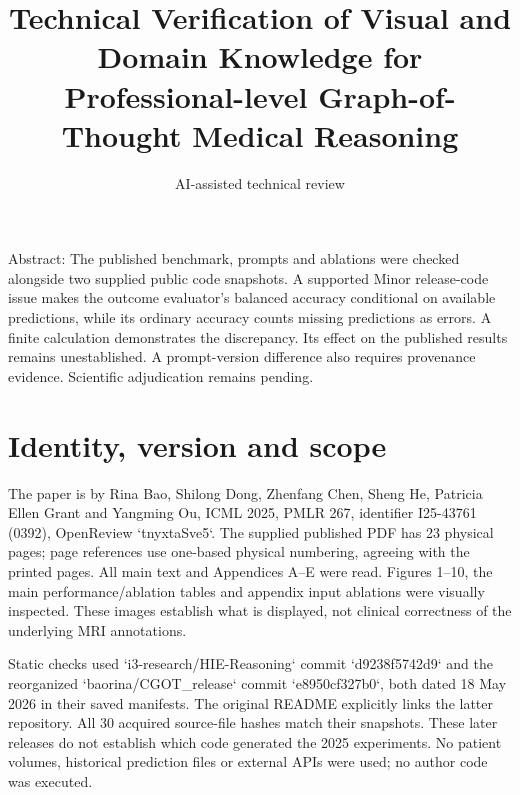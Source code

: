 \documentclass[10pt]{article}
\title{Technical Verification of Visual and Domain Knowledge for Professional-level Graph-of-Thought Medical Reasoning}
\author{AI-assisted technical review}
\date{}
\begin{document}
\maketitle
Abstract: The published benchmark, prompts and ablations were checked alongside two supplied public code snapshots. A supported Minor release-code issue makes the outcome evaluator’s balanced accuracy conditional on available predictions, while its ordinary accuracy counts missing predictions as errors. A finite calculation demonstrates the discrepancy. Its effect on the published results remains unestablished. A prompt-version difference also requires provenance evidence. Scientific adjudication remains pending.\par
\section*{Identity, version and scope}
The paper is by Rina Bao, Shilong Dong, Zhenfang Chen, Sheng He, Patricia Ellen Grant and Yangming Ou, ICML 2025, PMLR 267, identifier I25-43761 (0392), OpenReview `tnyxtaSve5`. The supplied published PDF has 23 physical pages; page references use one-based physical numbering, agreeing with the printed pages. All main text and Appendices A–E were read. Figures 1–10, the main performance/ablation tables and appendix input ablations were visually inspected. These images establish what is displayed, not clinical correctness of the underlying MRI annotations.\par
Static checks used `i3-research/HIE-Reasoning` commit `d9238f5742d9` and the reorganized `baorina/CGOT\_release` commit `e8950cf327b0`, both dated 18 May 2026 in their saved manifests. The original README explicitly links the latter repository. All 30 acquired source-file hashes match their snapshots. These later releases do not establish which code generated the 2025 experiments. No patient volumes, historical prediction files or external APIs were used; no author code was executed.\par
\end{document}
